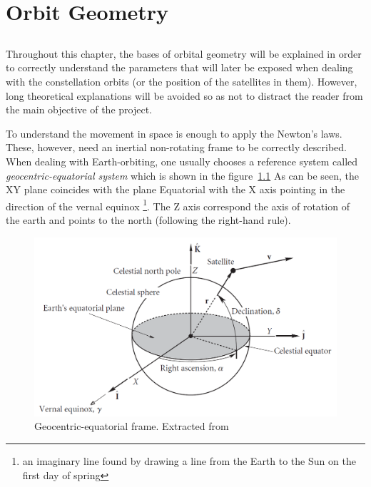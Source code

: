 \chapter{Orbit Geometry}


\section*{}
Throughout this chapter, the bases of orbital geometry will be explained in order to correctly understand the parameters that will later be exposed when dealing with the constellation orbits (or the position of the satellites in them). However, long theoretical explanations will be avoided so as not to distract the reader from the main objective of the project.

To understand the movement in space is enough to apply the Newton's laws. These, however, need an inertial non-rotating frame to be correctly described. When dealing with Earth-orbiting, one usually chooses a reference system called \textit{geocentric-equatorial system} which is shown in the figure~\ref{fig:eqframe} As can be seen, the XY plane coincides with the plane Equatorial with the X axis pointing in the direction of the vernal equinox \footnote{an imaginary line found by drawing a line from the Earth to the Sun on the first day of spring}. The Z axis correspond the axis of rotation of the earth and points to the north (following the right-hand rule).

\begin{figure}[H]
\centering
\includegraphics[scale=.55]{./Geometry/fig-Ch1-Geometry/eqframe.png}
\caption[Geocentric-equatorial frame]{Geocentric-equatorial frame. Extracted from \cite{Curtis2010}}
\label{fig:eqframe}
\end{figure}

